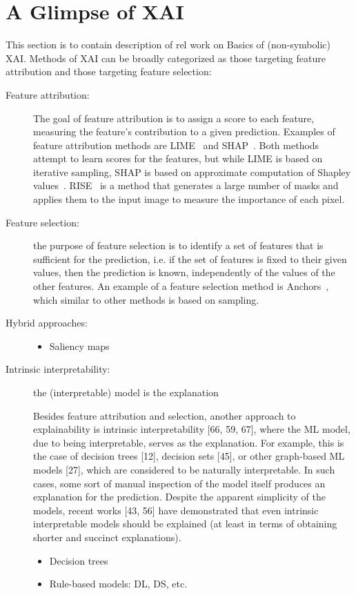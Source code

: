 \section{A  Glimpse of XAI} \label{sec:glimpsexai}

This section is to contain description of rel work on Basics of (non-symbolic) XAI. 
Methods of XAI can be broadly categorized as those targeting feature
attribution and those targeting feature selection:

\begin{description} 
\item[Feature attribution:] %
%
The goal of feature
attribution is to assign a score to each feature, measuring the feature’s contribution to a given prediction. Examples of feature attribution methods are
LIME~\cite{guestrin-kdd16} and SHAP~\cite{lundberg-nips17}. 
Both methods attempt to learn scores for the
features, but while LIME is based on iterative sampling, SHAP is based on
approximate computation of Shapley values~\cite{shapley53}. 
%
RISE~\cite{Petsiuk-corr18} is a method that generates a large number of masks and applies them to the input image to measure the importance of each pixel.

\item[Feature selection:]
the purpose of feature selection is to identify a set of features
that is sufficient for the prediction, i.e. if the set of features is fixed to their
given values, then the prediction is known, independently of the values of the
other features. An example of a feature selection method is Anchors~\cite{guestrin-aaai18},
which similar to other methods is based on sampling.


\item[Hybrid approaches:]
\begin{itemize}
\item Saliency maps~\cite{muller-ieee-proc21}
\end{itemize}

\item[Intrinsic interpretability:] the (interpretable) model is the explanation 

Besides feature attribution and selection, another approach to explainability is intrinsic interpretability [66, 59, 67], where the ML model, due to being
interpretable, serves as the explanation. For example, this is the case of decision trees [12], decision sets [45], or other graph-based ML models [27], which
are considered to be naturally interpretable. In such cases, some sort of manual inspection of the model itself produces an explanation for the prediction.
Despite the apparent simplicity of the models, recent works [43, 56] have
demonstrated that even intrinsic interpretable models should be explained
(at least in terms of obtaining shorter and succinct explanations).

\begin{itemize}
\item Decision trees
\item Rule-based models: DL, DS, etc.
\end{itemize}

\end{description}